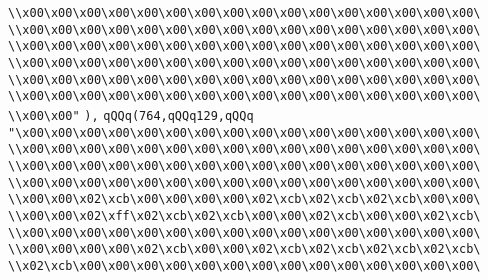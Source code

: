 \verb|\\x00\x00\x00\x00\x00\x00\x00\x00\x00\x00\x00\x00\x00\x00\x00\x00\|\newline
\verb|\\x00\x00\x00\x00\x00\x00\x00\x00\x00\x00\x00\x00\x00\x00\x00\x00\|\newline
\verb|\\x00\x00\x00\x00\x00\x00\x00\x00\x00\x00\x00\x00\x00\x00\x00\x00\|\newline
\verb|\\x00\x00\x00\x00\x00\x00\x00\x00\x00\x00\x00\x00\x00\x00\x00\x00\|\newline
\verb|\\x00\x00\x00\x00\x00\x00\x00\x00\x00\x00\x00\x00\x00\x00\x00\x00\|\newline
\verb|\\x00\x00\x00\x00\x00\x00\x00\x00\x00\x00\x00\x00\x00\x00\x00\x00\|\newline
\verb|\\x00\x00"|\newline
\verb|),|\newline
\verb|qQQq(764,qQQq129,qQQq|\newline
\verb|"\x00\x00\x00\x00\x00\x00\x00\x00\x00\x00\x00\x00\x00\x00\x00\x00\|\newline
\verb|\\x00\x00\x00\x00\x00\x00\x00\x00\x00\x00\x00\x00\x00\x00\x00\x00\|\newline
\verb|\\x00\x00\x00\x00\x00\x00\x00\x00\x00\x00\x00\x00\x00\x00\x00\x00\|\newline
\verb|\\x00\x00\x00\x00\x00\x00\x00\x00\x00\x00\x00\x00\x00\x00\x00\x00\|\newline
\verb|\\x00\x00\x02\xcb\x00\x00\x00\x00\x02\xcb\x02\xcb\x02\xcb\x00\x00\|\newline
\verb|\\x00\x00\x02\xff\x02\xcb\x02\xcb\x00\x00\x02\xcb\x00\x00\x02\xcb\|\newline
\verb|\\x00\x00\x00\x00\x00\x00\x00\x00\x00\x00\x00\x00\x00\x00\x00\x00\|\newline
\verb|\\x00\x00\x00\x00\x02\xcb\x00\x00\x02\xcb\x02\xcb\x02\xcb\x02\xcb\|\newline
\verb|\\x02\xcb\x00\x00\x00\x00\x00\x00\x00\x00\x00\x00\x00\x00\x00\x00\|\newline
